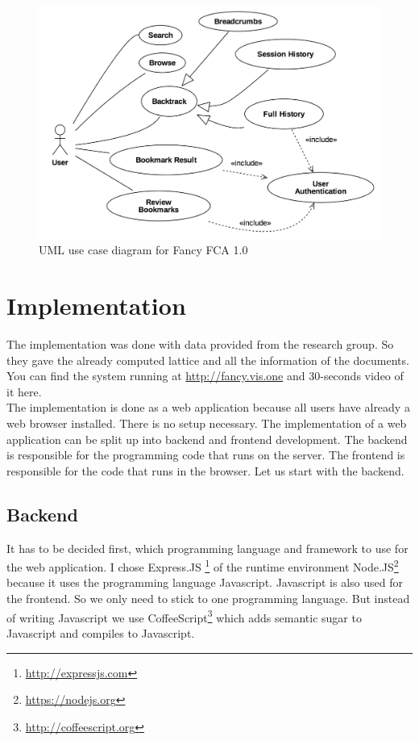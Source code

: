 \documentclass[11pt]{report}
\begin{document}
\begin{figure}[!ht]
	\centering
	\includegraphics[width=\linewidth]{images/usecase}
\caption{UML use case diagram for Fancy FCA 1.0}
\label{figure:usecase}
\end{figure}

\section{Implementation}

The implementation was done with data provided from the research group. So they gave the already computed lattice and all the information of the documents. You can find the system running at \url{http://fancy.vis.one} and 30-seconds video of it here. \\

The implementation is done as a web application because all users have already a web browser installed. There is no setup necessary. The implementation of a web application can be split up into backend and frontend development. The backend is responsible for the programming code that runs on the server. The frontend is responsible for the code that runs in the browser. Let us start with the backend.

\subsection{Backend}

It has to be decided first, which programming language and framework to use for the web application. I chose Express.JS \footnote{\url{http://expressjs.com}} of the runtime environment Node.JS\footnote{\url{https://nodejs.org}} because it uses the programming language Javascript. Javascript is also used for the frontend. So we only need to stick to one programming language. But instead of writing Javascript we use CoffeeScript\footnote{\url{http://coffeescript.org}} which adds semantic sugar to Javascript and compiles to Javascript.\\
\end{document}
